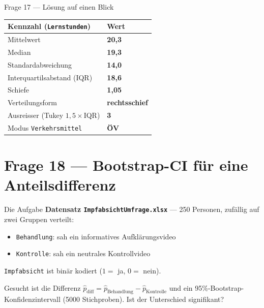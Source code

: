 \documentclass[aspectratio=169,11pt]{beamer}
\begin{document}
\begin{frame}{Frage 17 --- Lösung auf einen Blick}
\centering
\renewcommand{\arraystretch}{1.3}
\begin{tabular}{ll}
\toprule
Kennzahl (\texttt{Lernstunden}) & Wert \\
\midrule
Mittelwert            & \textbf{20{,}3} \\
Median                & \textbf{19{,}3} \\
Standardabweichung    & \textbf{14{,}0} \\
Interquartilsabstand (IQR) & \textbf{18{,}6} \\
Schiefe               & \textbf{1{,}05} \\
Verteilungsform       & \textbf{rechtsschief} \\
Ausreisser (Tukey $1{,}5\times$IQR) & \textbf{3} \\
\midrule
Modus \texttt{Verkehrsmittel} & \textbf{ÖV} \\
\bottomrule
\end{tabular}
\end{frame}

\section{Frage 18 --- Bootstrap-CI für eine Anteilsdifferenz}

\begin{frame}{Die Aufgabe}
\textbf{Datensatz \texttt{ImpfabsichtUmfrage.xlsx}} --- 250 Personen, zufällig
auf zwei Gruppen verteilt:
\begin{itemize}
  \item \texttt{Behandlung}: sah ein informatives Aufklärungsvideo
  \item \texttt{Kontrolle}: sah ein neutrales Kontrollvideo
\end{itemize}
\texttt{Impfabsicht} ist binär kodiert ($1 =$ ja, $0 =$ nein).

\vspace{0.3cm}
Gesucht ist die Differenz
$\hat p_{\text{diff}} = \hat p_{\text{Behandlung}} - \hat p_{\text{Kontrolle}}$
und ein \alert{95\%-Bootstrap-Konfidenzintervall} (5000 Stichproben).
Ist der Unterschied \alert{signifikant}?
\end{frame}
\end{document}
